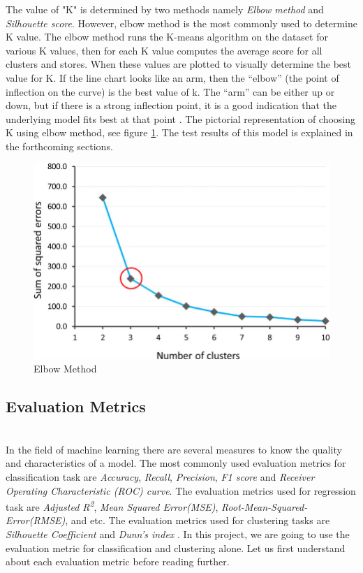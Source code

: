 \documentclass[format=sigconf]{acmart}
\begin{document}
The value of "K" is determined by two methods namely \textit{Elbow method} and \textit{Silhouette score}. However, elbow method is 
the most commonly used to determine K value. The elbow method runs the K-means algorithm on the dataset for various K values, then
for each K value computes the average score for all clusters and stores. When these values are plotted to visually determine the best 
value for K. If the line chart looks like an arm, then the “elbow” (the point of inflection on the curve) is the best value of k. 
The “arm” can be either up or down, but if there is a strong inflection point, it is a good indication that the underlying model 
fits best at that point \cite{elbow}. The pictorial representation of choosing K using elbow method, see figure \ref{fig:elbowmethod}.
The test results of this model is explained in the forthcoming sections.
\begin{figure}[H]
    \centering
    \includegraphics[scale=0.25]{elbow_method.png}
    \caption{Elbow Method}
    \label{fig:elbowmethod}
\end{figure}

\subsection{Evaluation Metrics}
\hfill\\
In the field of machine learning there are several measures to know the quality and characteristics of a model. The most commonly used
evaluation metrics for classification task are \textit{Accuracy}, \textit{Recall}, \textit{Precision}, \textit{F1 score} and 
\textit{Receiver Operating Characteristic (ROC) curve}. The evaluation metrics used for regression task are 
\textit{Adjusted R\textsuperscript{2}}, \textit{Mean Squared Error(MSE)}, \textit{Root-Mean-Squared-Error(RMSE)}, and etc. 
The evaluation metrics used for clustering tasks are \textit{Silhouette Coefficient} and \textit{Dunn's index} 
\cite{powers2020evaluation}. In this project, we are going to use the evaluation metric for classification and clustering alone. 
Let us first understand about each evaluation metric before reading further.
\end{document}
